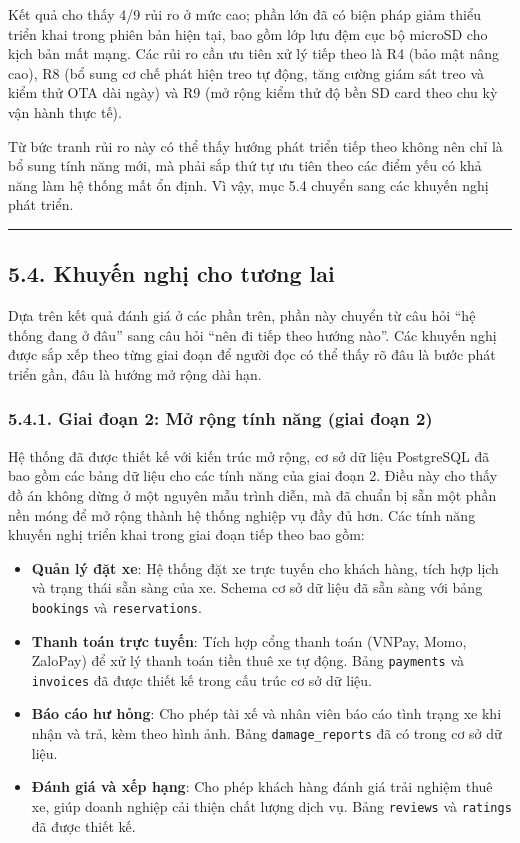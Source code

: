 \documentclass[a4paper]{extarticle}
\providecommand{\tightlist}{%
  \setlength{\itemsep}{0pt}\setlength{\parskip}{0pt}}
\begin{document}
Kết quả cho thấy 4/9 rủi ro ở mức cao; phần lớn đã có biện pháp giảm
thiểu triển khai trong phiên bản hiện tại, bao gồm lớp lưu đệm cục bộ
microSD cho kịch bản mất mạng. Các rủi ro cần ưu tiên xử lý tiếp theo là
R4 (bảo mật nâng cao), R8 (bổ sung cơ chế phát hiện treo tự động, tăng cường giám sát treo và
kiểm thử OTA dài ngày) và R9 (mở rộng kiểm thử độ bền SD card theo chu
kỳ vận hành thực tế).

Từ bức tranh rủi ro này có thể thấy hướng phát triển tiếp theo không nên
chỉ là bổ sung tính năng mới, mà phải sắp thứ tự ưu tiên theo các điểm
yếu có khả năng làm hệ thống mất ổn định. Vì vậy, mục 5.4 chuyển sang
các khuyến nghị phát triển.

\begin{center}\rule{0.5\linewidth}{0.5pt}\end{center}

\subsection{5.4. Khuyến nghị cho tương
lai}\label{54-khuyux1ebfn-nghux1ecb-cho-tux1b0ux1a1ng-lai}

Dựa trên kết quả đánh giá ở các phần trên, phần này chuyển từ câu hỏi
``hệ thống đang ở đâu'' sang câu hỏi ``nên đi tiếp theo hướng nào''.
Các khuyến nghị được sắp xếp theo từng giai đoạn để người đọc có thể
thấy rõ đâu là bước phát triển gần, đâu là hướng mở rộng dài hạn.

\subsubsection{5.4.1. Giai đoạn 2: Mở rộng tính năng (giai đoạn
2)}\label{541-giai-ux111oux1ea1n-2-mux1edf-rux1ed9ng-tuxednh-nux103ng-phase-2}

Hệ thống đã được thiết kế với kiến trúc mở rộng, cơ sở dữ liệu
PostgreSQL đã bao gồm các bảng dữ liệu cho các tính năng của giai đoạn 2. Điều
này cho thấy đồ án không dừng ở một nguyên mẫu trình diễn, mà đã chuẩn
bị sẵn một phần nền móng để mở rộng thành hệ thống nghiệp vụ đầy đủ hơn.
Các tính năng khuyến nghị triển khai trong giai đoạn tiếp theo bao gồm:

\begin{itemize}
\tightlist
\item
\textbf{Quản lý đặt xe}: Hệ thống đặt xe trực tuyến cho
  khách hàng, tích hợp lịch và trạng thái sẵn sàng của xe. Schema
  cơ sở dữ liệu đã sẵn sàng với bảng \texttt{bookings} và
  \texttt{reservations}.
\item
  \textbf{Thanh toán trực tuyến}: Tích hợp cổng thanh toán
  (VNPay, Momo, ZaloPay) để xử lý thanh toán tiền thuê xe tự động. Bảng
  \texttt{payments} và \texttt{invoices} đã được thiết kế trong cấu trúc cơ sở dữ liệu.
\item
  \textbf{Báo cáo hư hỏng}: Cho phép tài xế và nhân
  viên báo cáo tình trạng xe khi nhận và trả, kèm theo hình ảnh. Bảng
  \texttt{damage\_reports} đã có trong cơ sở dữ liệu.
\item
  \textbf{Đánh giá và xếp hạng}: Cho phép khách hàng đánh giá
  trải nghiệm thuê xe, giúp doanh nghiệp cải thiện chất lượng dịch vụ.
  Bảng \texttt{reviews} và \texttt{ratings} đã được thiết kế.
\end{itemize}
\end{document}
